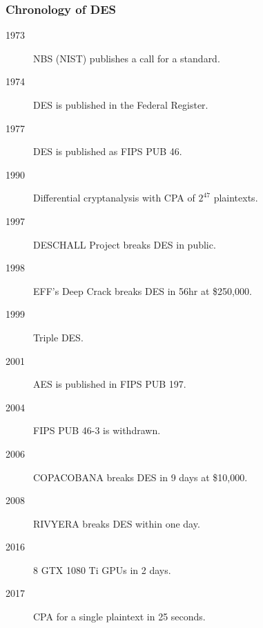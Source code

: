 \begin{comment}
\textbf{Idea}: The left/right half of the key affects the inputs only to the first/last four $S$-boxes. Brute-force needs $2\cdot 2^{28}$.
\end{columns}
\begin{itemize}
\item Check 16-bit XOR of outputs of four $S$-boxes on one half.
\item $2^{28}/2^{16}=2^{12}$ guesses on half-key pass check (with pr. $2^{-16}$).
\item Use another I/O pair to test $2^{12+12}$ keys (with exp. $2^{24-16\times 2}$).
\item Totally, $2\cdot 2^{28} + 2^{24} < 2^{30}$ time and $2\cdot 2^{12}$ space.
\end{itemize}
\end{frame}
\end{comment}
\begin{frame}\frametitle{Chronology of DES}
\begin{description}
\item[1973] NBS (NIST) publishes a call for a standard.
\item[1974] DES is published in the Federal Register.
\item[1977] DES is published as FIPS PUB 46.
\item[1990] Differential cryptanalysis with CPA of $2^{47}$ plaintexts. 
\item[1997] DESCHALL Project breaks DES in public.
\item[1998] EFF's Deep Crack breaks DES in 56hr at \$250,000.
\item[1999] Triple DES.
\item[2001] AES is published in FIPS PUB 197.
\item[2004] FIPS PUB 46-3 is withdrawn.
\item[2006] COPACOBANA breaks DES in 9 days at \$10,000.
\item[2008] RIVYERA breaks DES within one day.
\item[2016] 8 GTX 1080 Ti GPUs in 2 days.
\item[2017] CPA for a single plaintext in 25 seconds.
\end{description}
\end{frame}
